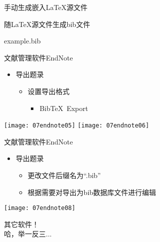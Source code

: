 \documentclass[fontset = none, t]{ctexbeamer}
\begin{document}
\begin{frame}[fragile]{手动生成}{嵌入\LaTeX 源文件}
\begin{spacing}{1.3}
\begin{center}
\begin{minipage}[h]{0.55\linewidth}
\begin{textcb}{随\LaTeX 源文件生成bib文件}
\begin{filecontents}{example.bib}
\begin{frame}[fragile]{文献管理软件}{EndNote}
  \begin{spacing}{1.2}
    \begin{itemize}
    \item 导出题录
      \begin{itemize}
      \item 设置导出格式
        \begin{itemize}
        \item Bib\TeX\ Export
        \end{itemize}
      \end{itemize}
    \end{itemize}
    \begin{center}
      \texttt{[image: 07endnote05]}\quad
      \texttt{[image: 07endnote06]}
    \end{center}
  \end{spacing}
\end{frame}

\begin{frame}[fragile]{文献管理软件}{EndNote}
  \begin{spacing}{1.2}
    \begin{itemize}
    \item 导出题录
      \begin{itemize}
      \item 更改文件后缀名为\enquote{.bib}
      \item 根据需要对导出为bib数据库文件进行编辑
      \end{itemize}
    \end{itemize}    
    \begin{center}
      \texttt{[image: 07endnote08]}
    \end{center}
  \end{spacing}
\end{frame}

\begin{frame}
  其它软件！\\
  哈，举一反三...
\end{frame}

\end{filecontents}
\end{textcb}
\end{minipage}
\end{center}
\end{spacing}
\end{frame}
\end{document}
